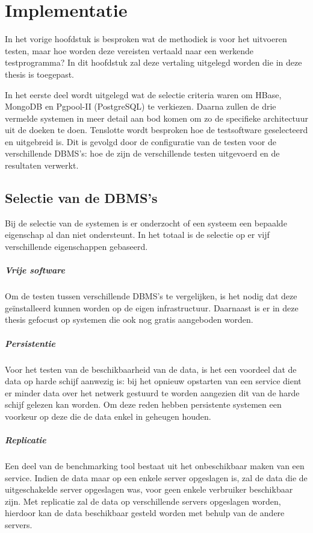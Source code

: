 \chapter{Implementatie}\label{sec:implementatie}
In het vorige hoofdstuk is besproken wat de methodiek is voor het uitvoeren testen, maar hoe worden deze vereisten vertaald naar een werkende testprogramma? In dit hoofdstuk zal deze vertaling uitgelegd worden die in deze thesis is toegepast. 

In het eerste deel wordt uitgelegd wat de selectie criteria waren om HBase, MongoDB en Pgpool-II (PostgreSQL) te verkiezen. Daarna zullen de drie vermelde systemen in meer detail aan bod komen om zo de specifieke architectuur uit de doeken te doen. Tenslotte wordt besproken hoe de testsoftware geselecteerd en uitgebreid is. Dit is gevolgd door de configuratie van de testen voor de verschillende DBMS's: hoe de zijn de verschillende testen uitgevoerd en de resultaten verwerkt. 
 
\section{Selectie van de DBMS's}
Bij de selectie van de systemen is er onderzocht of een systeem een bepaalde eigenschap al dan niet ondersteunt. In het totaal is de selectie op er vijf verschillende eigenschappen gebaseerd. 

\paragraph{Vrije software} Om de testen tussen verschillende DBMS's te vergelijken, is het nodig dat deze geïnstalleerd kunnen worden op de eigen infrastructuur. Daarnaast is er in deze thesis gefocust op systemen die ook nog gratis aangeboden worden. 

\paragraph{Persistentie} Voor het testen van de beschikbaarheid van de data, is het een voordeel dat de data op harde schijf aanwezig is: bij het opnieuw opstarten van een service dient er minder data over het netwerk gestuurd te worden aangezien dit van de harde schijf gelezen kan worden. Om deze reden hebben persistente systemen een voorkeur op deze die de data enkel in geheugen houden. 

\paragraph{Replicatie} Een deel van de benchmarking tool bestaat uit het onbeschikbaar maken van een service. Indien de data maar op een enkele server opgeslagen is, zal de data die de uitgeschakelde server opgeslagen was, voor geen enkele verbruiker beschikbaar zijn. Met replicatie zal de data op verschillende servers opgeslagen worden, hierdoor kan de data beschikbaar gesteld worden met behulp van de andere servers.

